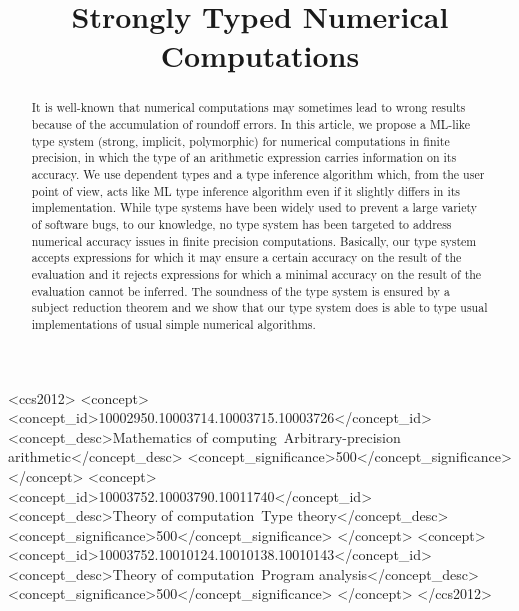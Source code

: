 \documentclass[format=acmsmall]{acmart}
\title{Strongly Typed Numerical Computations}
\begin{document}

\begin{abstract}
It is well-known that numerical computations may 
sometimes lead to wrong results because of the accumulation of roundoff errors. In this article,
we propose a ML-like type system (strong, implicit, polymorphic) for numerical computations in
 finite precision, in which the type of an 
arithmetic expression carries information on its accuracy. We  use dependent types 
and a type inference algorithm which, from the user point of view, 
acts like ML  type inference algorithm even if it slightly differs in its implementation. 
While type systems have been widely
used to prevent a large variety of software bugs, to our knowledge, no type system has been targeted 
to address numerical accuracy issues in finite precision computations.
Basically, our type system accepts expressions for which it may ensure a certain accuracy on the result of 
the evaluation and it rejects expressions for which a minimal 
accuracy on the result of the evaluation cannot be inferred. The soundness of the type system is ensured
by a subject reduction theorem and  
we show that our type system does  is able to type usual implementations 
 of usual simple numerical algorithms.
\end{abstract}




\begin{CCSXML}
<ccs2012>
<concept>
<concept_id>10002950.10003714.10003715.10003726</concept_id>
<concept_desc>Mathematics of computing~Arbitrary-precision arithmetic</concept_desc>
<concept_significance>500</concept_significance>
</concept>
<concept>
<concept_id>10003752.10003790.10011740</concept_id>
<concept_desc>Theory of computation~Type theory</concept_desc>
<concept_significance>500</concept_significance>
</concept>
<concept>
<concept_id>10003752.10010124.10010138.10010143</concept_id>
<concept_desc>Theory of computation~Program analysis</concept_desc>
<concept_significance>500</concept_significance>
</concept>
</ccs2012>
\end{CCSXML}

\end{document}
